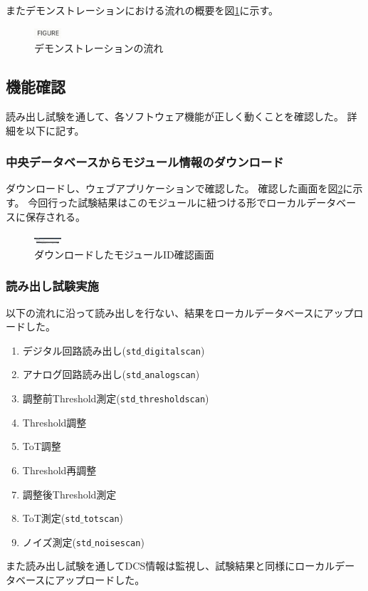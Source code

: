 またデモンストレーションにおける流れの概要を図\ref{demo_flow}に示す。

\begin{figure}[bpt]\centering
\includegraphics[width=1cm]{figure}
\caption[デモンストレーションの流れ]{デモンストレーションの流れ}
\label{demo_flow}
\end{figure}


\subsection{機能確認}
読み出し試験を通して、各ソフトウェア機能が正しく動くことを確認した。
詳細を以下に記す。

\subsubsection{中央データベースからモジュール情報のダウンロード}
ダウンロードし、ウェブアプリケーションで確認した。
確認した画面を図\ref{demo_download_SCC}に示す。
今回行った試験結果はこのモジュールに紐つける形でローカルデータベースに保存される。

\begin{figure}[bpt]\centering
\includegraphics[width=1cm]{demo_download_SCC}
\caption[ダウンロードしたモジュールID確認画面]{ダウンロードしたモジュールID確認画面}
\label{demo_download_SCC}
\end{figure}


\subsubsection{読み出し試験実施}
以下の流れに沿って読み出しを行ない、結果をローカルデータベースにアップロードした。
\begin{enumerate}
  \item デジタル回路読み出し(\texttt{std$\_$digitalscan})
  \item アナログ回路読み出し(\texttt{std$\_$analogscan})
  \item 調整前Threshold測定(\texttt{std$\_$thresholdscan})
  \item Threshold調整
  \item ToT調整
  \item Threshold再調整
  \item 調整後Threshold測定
  \item ToT測定(\texttt{std$\_$totscan})
  \item ノイズ測定(\texttt{std$\_$noisescan})
\end{enumerate}
また読み出し試験を通してDCS情報は監視し、試験結果と同様にローカルデータベースにアップロードした。

